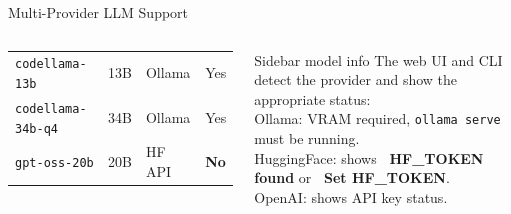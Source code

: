 \documentclass[aspectratio=169,10pt]{beamer}
\newcommand{\hlg}[1]{\textcolor{qirgreen}{\textbf{#1}}}
\newcommand{\hlr}[1]{\textcolor{condred}{\textbf{#1}}}
\begin{document}
\begin{frame}{Multi-Provider LLM Support}
\begin{columns}[T]
\begin{tabular}{@{}llll@{}}
        \texttt{codellama-13b} & 13B & Ollama & Yes \\
        \texttt{codellama-34b-q4} & 34B & Ollama & Yes \\
        \texttt{gpt-oss-20b} & 20B & HF API & \hlg{No} \\
        \bottomrule
      \end{tabular}
      \vspace{6pt}
      \begin{block}{Sidebar model info}
        \scriptsize
        The web UI and CLI detect the provider and show
        the appropriate status:\\[2pt]
        Ollama: VRAM required, \texttt{ollama serve} must be running.\\[2pt]
        HuggingFace: shows \hlg{\faCheckCircle\ HF\_TOKEN found} or
        \hlr{\faExclamationTriangle\ Set HF\_TOKEN}.\\[2pt]
        OpenAI: shows API key status.
      \end{block}
  \end{columns}
\end{frame}
\end{document}
